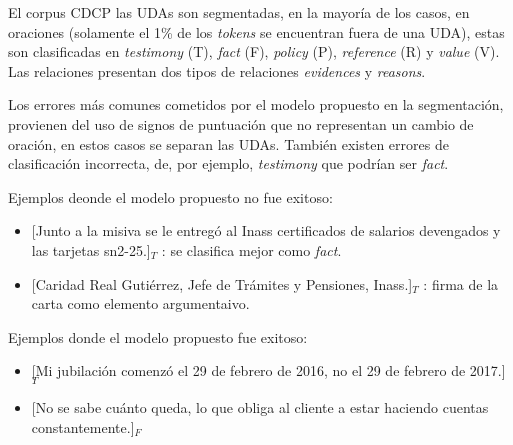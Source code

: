 \documentclass[a4paper,11pt,twocolumn,twoside]{article}
\begin{document}
El corpus CDCP las UDAs son segmentadas, en la mayoría de los casos, en oraciones 
(solamente el 1\% de los \textit{tokens} se encuentran fuera de una UDA),
estas son clasificadas en \textit{testimony} (T), \textit{fact} (F), \textit{policy} (P), \textit{reference} (R)
y \textit{value} (V). Las relaciones presentan dos tipos de relaciones \textit{evidences} y \textit{reasons}.

Los errores más comunes cometidos por el modelo propuesto en la segmentación, provienen del uso 
de signos de puntuación que no representan un cambio de oración, en estos casos se separan las UDAs. También
existen errores de clasificación incorrecta, de, por ejemplo, \textit{testimony} que podrían ser \textit{fact}.

Ejemplos deonde el modelo propuesto no fue exitoso:
\begin{itemize}
	\item \text{} [Junto a la misiva se le entregó al Inass certificados de salarios devengados y las tarjetas sn2-25.]$_T$
	      : se clasifica mejor como \textit{fact}. %
	\item \text{} [Caridad Real Gutiérrez, Jefe de Trámites y Pensiones, Inass.]$_T$
	      : firma de la carta como elemento argumentaivo. %
\end{itemize}

Ejemplos donde el modelo propuesto fue exitoso:
\begin{itemize}
	\item \text{} [Mi jubilación comenzó el 29 de febrero de 2016, no el 29 de febrero de 2017.]$_T$ %
	\item \text{} [No se sabe cuánto queda, lo que obliga al cliente a estar haciendo cuentas constantemente.]$_F$ %
\end{itemize}
\end{document}

